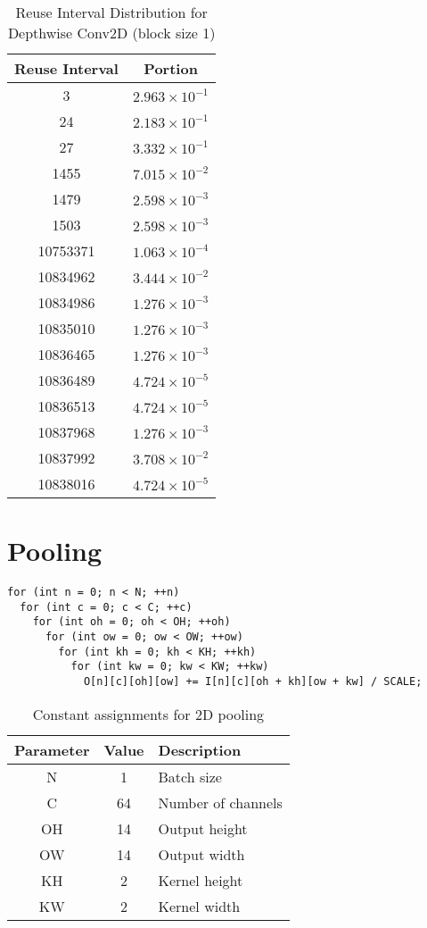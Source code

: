 \documentclass[conference]{article}
\begin{document}
\begin{table}[H]
\centering
\begin{tabular}{|c|c|}
    \hline
    Reuse Interval & Portion \\ 
    \hline
    3 & $2.963 \times 10^{-1}$ \\ 
    24 & $2.183 \times 10^{-1}$ \\ 
    27 & $3.332 \times 10^{-1}$ \\ 
    1455 & $7.015 \times 10^{-2}$ \\ 
    1479 & $2.598 \times 10^{-3}$ \\ 
    1503 & $2.598 \times 10^{-3}$ \\ 
    10753371 & $1.063 \times 10^{-4}$ \\ 
    10834962 & $3.444 \times 10^{-2}$ \\ 
    10834986 & $1.276 \times 10^{-3}$ \\ 
    10835010 & $1.276 \times 10^{-3}$ \\ 
    10836465 & $1.276 \times 10^{-3}$ \\ 
    10836489 & $4.724 \times 10^{-5}$ \\ 
    10836513 & $4.724 \times 10^{-5}$ \\ 
    10837968 & $1.276 \times 10^{-3}$ \\ 
    10837992 & $3.708 \times 10^{-2}$ \\ 
    10838016 & $4.724 \times 10^{-5}$ \\ 
    \hline
\end{tabular}
\caption{Reuse Interval Distribution for Depthwise Conv2D (block size 1)}
\end{table}

\section{Pooling}
\begin{verbatim}
for (int n = 0; n < N; ++n)
  for (int c = 0; c < C; ++c)
    for (int oh = 0; oh < OH; ++oh)
      for (int ow = 0; ow < OW; ++ow)
        for (int kh = 0; kh < KH; ++kh)
          for (int kw = 0; kw < KW; ++kw)
            O[n][c][oh][ow] += I[n][c][oh + kh][ow + kw] / SCALE;    
\end{verbatim}

\begin{table}[H]
\centering
\begin{tabular}{|c|c|l|}
\hline
Parameter & Value & Description \\
\hline
N & 1 & Batch size \\
C & 64 & Number of channels \\
OH & 14 & Output height \\
OW & 14 & Output width \\
KH & 2 & Kernel height \\
KW & 2 & Kernel width \\
\hline
\end{tabular}
\caption{Constant assignments for 2D pooling}
\end{table}
\end{document}
